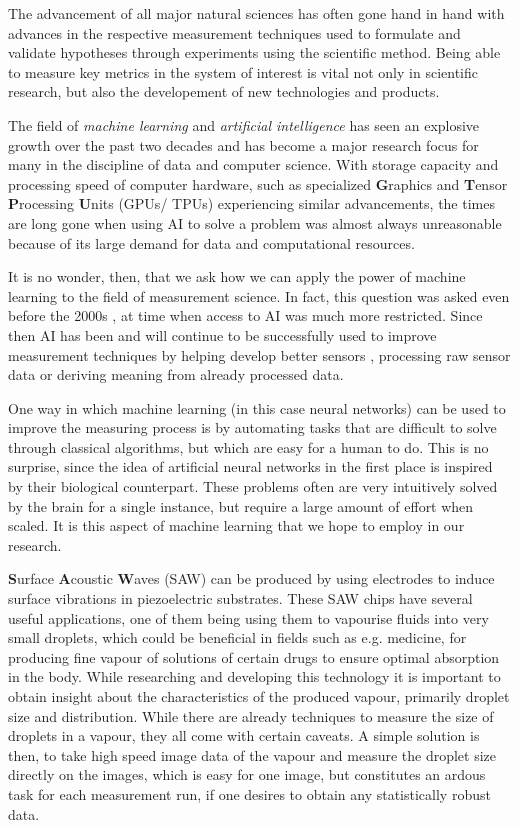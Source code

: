 The advancement of all major natural sciences has often gone hand in hand with advances in the respective measurement techniques used to formulate and validate hypotheses through experiments using the scientific method. 
Being able to measure key metrics in the system of interest is vital not only in scientific research, but also the developement of new technologies and products. 

The field of \emph{machine learning} and \emph{artificial intelligence} has seen an explosive growth over the past two decades and has become a major research focus for many in the discipline of data and computer science. 
With storage capacity and processing speed of computer hardware, such as specialized \textbf{G}raphics and \textbf{T}ensor \textbf{P}rocessing \textbf{U}nits (GPUs/ TPUs) experiencing similar advancements, the times are long gone when using AI to solve a problem was almost always unreasonable because of its large demand for data and computational resources. 

It is no wonder, then, that we ask how we can apply the power of machine learning to the field of measurement science. In fact, this question was asked even before the 2000s \cite{alippiArtificialIntelligenceInstruments1998}, at time when access to AI was much more restricted. Since then AI has been and will continue to be successfully used to improve measurement techniques by helping develop better sensors \cite{ballardMachineLearningComputationenabled2021}, processing raw sensor data or deriving meaning from already processed data. 

One way in which machine learning (in this case neural networks) can be used to improve the measuring process is by automating tasks that are difficult to solve through classical algorithms, but which are easy for a human to do. This is no surprise, since the idea of artificial neural networks in the first place is inspired by their biological counterpart. These problems often are very intuitively solved by the brain for a single instance, but require a large amount of effort when scaled. 
It is this aspect of machine learning that we hope to employ in our research. 

\textbf{S}urface \textbf{A}coustic \textbf{W}aves (SAW) can be produced by using electrodes to induce surface vibrations in piezoelectric substrates. These SAW chips have several useful applications, one of them being using them to vapourise fluids into very small droplets, which could be beneficial in fields such as e.g. medicine, for producing fine vapour of solutions of certain drugs to ensure optimal absorption in the body.
While researching and developing this technology it is important to obtain insight about the characteristics of the produced vapour, primarily droplet size and distribution. While there are already techniques to measure the size of droplets in a vapour, they all come with certain caveats. A simple solution is then, to take high speed image data of the vapour and measure the droplet size directly on the images, which is easy for one image, but constitutes an ardous task for each measurement run, if one desires to obtain any statistically robust data.

